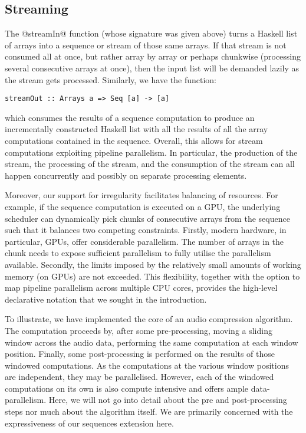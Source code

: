 \subsection{Streaming}
\label{sec:streaming}

The @streamIn@ function (whose signature was given above) turns a Haskell list of arrays into a sequence or stream of those same arrays. If that stream is not consumed all at once, but rather array by array or perhaps chunkwise (processing several consecutive arrays at once), then the input list will be demanded lazily as the stream gets processed. Similarly, we have the function:
%
\begin{lstlisting}
streamOut :: Arrays a => Seq [a] -> [a]
\end{lstlisting}
%
which consumes the results of a sequence computation to produce an incrementally constructed Haskell list with all the results of all the array computations contained in the sequence. Overall, this allows for stream computations exploiting pipeline parallelism. In particular, the production of the stream, the processing of the stream, and the consumption of the stream can all happen concurrently and possibly on separate processing elements.

Moreover, our support for irregularity facilitates balancing of resources. For example, if the sequence computation is executed on a GPU, the underlying scheduler can dynamically pick chunks of consecutive arrays from the sequence such that it balances two competing constraints. Firstly, modern hardware, in particular, GPUs, offer considerable parallelism. The number of arrays in the chunk needs to expose sufficient parallelism to fully utilise the parallelism available. Secondly, the limits imposed by the relatively small amounts of working memory (on GPUs) are not exceeded. This flexibility, together with the option to map pipeline parallelism across multiple CPU cores, provides the high-level declarative notation that we sought in the introduction.

To illustrate, we have implemented the core of an audio compression algorithm. The computation proceeds by, after some pre-processing, moving a sliding window across the audio data, performing the same computation at each window position. Finally, some post-processing is performed on the results of those windowed computations. As the computations at the various window positions are independent, they may be parallelised. However, each of the windowed computations on its own is also compute intensive and offers ample data-parallelism. Here, we will not go into detail about the pre and post-processing steps nor much about the algorithm itself. We are primarily concerned with the expressiveness of our sequences extension here.

